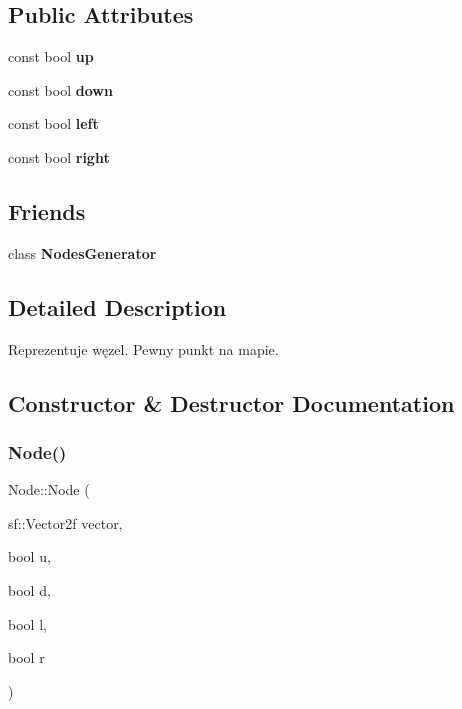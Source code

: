 \subsection*{Public Attributes}
\begin{DoxyCompactItemize}
\item 
\mbox{\label{classNode_a27f215e6d295a677f2ad702ca2083001}} 
const bool {\bfseries up}
\item 
\mbox{\label{classNode_a71977171a0abc49390c0c7a7976d4a84}} 
const bool {\bfseries down}
\item 
\mbox{\label{classNode_a6c681f5bc130c9da117cfc0b79d39403}} 
const bool {\bfseries left}
\item 
\mbox{\label{classNode_ae205eb30fb98f214e47c1ca986d0b4d1}} 
const bool {\bfseries right}
\end{DoxyCompactItemize}
\subsection*{Friends}
\begin{DoxyCompactItemize}
\item 
\mbox{\label{classNode_ab3dcf7a71a5faa0435fdf9db8d28f7f7}} 
class {\bfseries Nodes\+Generator}
\end{DoxyCompactItemize}


\subsection{Detailed Description}
Reprezentuje węzel. Pewny punkt na mapie. 

\subsection{Constructor \& Destructor Documentation}
\mbox{\label{classNode_a691046668b01fa3af260a3891c993f99}} 
\subsubsection{\texorpdfstring{Node()}{Node()}}
{\footnotesize\ttfamily Node\+::\+Node (\begin{DoxyParamCaption}\item[{sf\+::\+Vector2f}]{vector,  }\item[{bool}]{u,  }\item[{bool}]{d,  }\item[{bool}]{l,  }\item[{bool}]{r }\end{DoxyParamCaption})}


